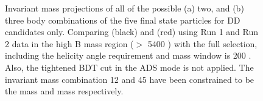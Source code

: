 \begin{figure}
\hfill
{}
\caption{Invariant mass projections of all of the possible (a) two, and (b) three body combinations of the five final state particles for DD candidates only. Comparing \decay{\Dz}{\Km\pip} (black) and \decay{\Dz}{\Kp\pim} (red) using Run 1 and Run 2 data in the high B mass region ($>$ 5400 \mevcc) with the full selection, including the \KS helicity angle requirement and \Kstar mass window is 200 \mev. Also, the tightened BDT cut in the ADS mode is not applied. The invariant mass combination 12 and 45 have been constrained to be the \Dz mass and \KS mass respectively.}
\label{projectionstighter}
\end{figure}

